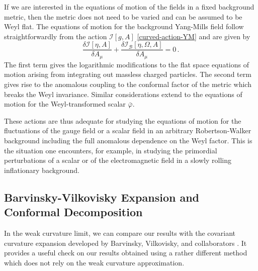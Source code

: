 \documentclass[12pt,a4paper]{article}
\newcommand{\be}{\begin{equation}}
\newcommand{\ee}{\end{equation}}
\newcommand{\cB}{\mathcal{B}}
\newcommand{\cI}{\mathcal{I}}
\renewcommand{\d}{\delta}
\newcommand{\m}{\mu}
\newcommand{\1}{{\textbf{1}}}
\newcommand{\+}{{\,+ \,}}
\begin{document}
If we are interested in the equations of motion of the fields in a fixed background  metric, then the metric does not need to be varied and can be assumed to be Weyl flat. 
The equations of motion for the background Yang-Mills field follow straightforwardly from the action $\cI[g, A]$ \eqref{curved-action-YM} and are given by
\be
\frac{\d\cI[\eta, A]}{\d A_{\m}} + \frac{\d\cI_{\cB}[\eta, \Omega, A]}{\d A_{\m}} = 0\, .
\ee
The first term gives the logarithmic modifications to the flat space equations of motion arising from integrating out massless charged particles. The second term gives rise to the anomalous coupling to the conformal factor of the metric which breaks the Weyl invariance. Similar considerations extend to the equations of motion for the Weyl-transformed scalar $\bar\varphi$.

These  actions are thus adequate for studying the  equations of motion for the  fluctuations of the gauge field or a scalar field in an arbitrary Robertson-Walker background including the full anomalous dependence on the Weyl factor. This is the situation one encounters, for example, in studying the primordial perturbations of a scalar or of the electromagnetic field in a slowly rolling inflationary background.


\subsection{Barvinsky-Vilkovisky Expansion and Conformal Decomposition\label{BV}}

In the weak curvature limit, we can compare our results with the covariant curvature expansion developed by Barvinsky, Vilkovisky, and collaborators \cite{Barvinsky:1984jd,Barvinsky:1985an, 
Barvinsky:1988ds,Barvinsky:1994hw,Barvinsky:1994cg,Barvinsky:1995it}.
It  provides a useful check on our results obtained using a rather different method which does not rely on the weak curvature approximation. 
\end{document}

